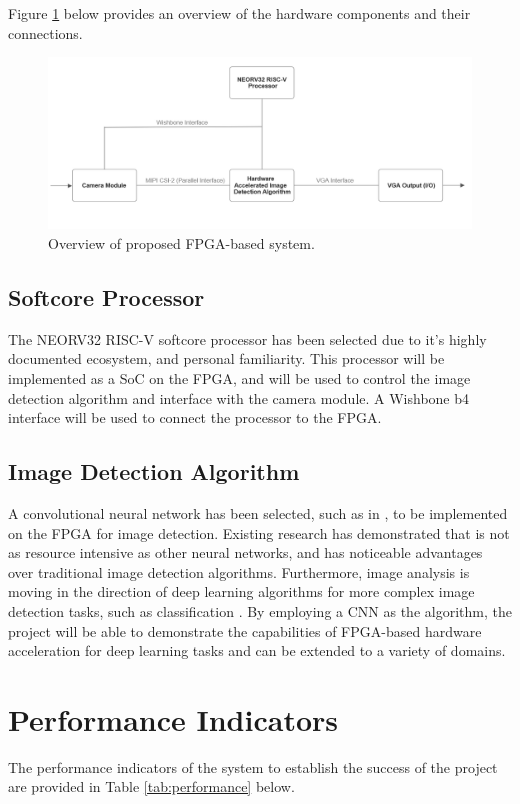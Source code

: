 Figure \ref{fig:overview} below provides an overview of the hardware components and their connections.

\begin{figure}[h]
    \centering
    \includegraphics[width=1\textwidth]{Assets/Overview.png}
    \caption{Overview of proposed FPGA-based system.}
    \label{fig:overview}
\end{figure}

\subsection{Softcore Processor}
The NEORV32 RISC-V softcore processor has been selected due to it's highly documented ecosystem, and personal familiarity. 
This processor will be implemented as a SoC on the FPGA, and will be used to control the image detection algorithm and interface with the camera module.
A Wishbone b4 interface will be used to connect the processor to the FPGA.

\subsection{Image Detection Algorithm}
A convolutional neural network has been selected, such as in \cite{Gradient}, to be implemented on the FPGA for image detection.
Existing research has demonstrated that is not as resource intensive as other neural networks, and has noticeable advantages over traditional image detection algorithms.
Furthermore, image analysis is moving in the direction of deep learning algorithms for more complex image detection tasks, such as classification \cite{DCNN}.
By employing a CNN as the algorithm, the project will be able to demonstrate the capabilities of FPGA-based hardware acceleration for deep learning tasks and can be extended to a variety of domains.


\section{Performance Indicators}
The performance indicators of the system to establish the success of the project are provided in Table \ref{tab:performance} below.

